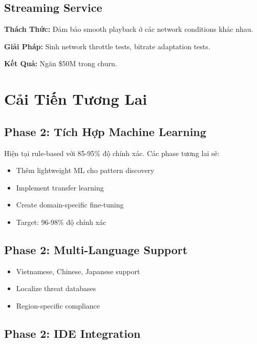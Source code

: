 \documentclass[12pt,oneside]{report}
\begin{document}
\section{Streaming Service}

\textbf{Thách Thức:} Đảm bảo smooth playback ở các network conditions khác nhau.

\textbf{Giải Pháp:} Sinh network throttle tests, bitrate adaptation tests.

\textbf{Kết Quả:} Ngăn \$50M trong churn.


\chapter{Cải Tiến Tương Lai}

\section{Phase 2: Tích Hợp Machine Learning}

Hiện tại rule-based với 85-95\% độ chính xác. Các phase tương lai sẽ:

\begin{itemize}
    \item Thêm lightweight ML cho pattern discovery
    \item Implement transfer learning
    \item Create domain-specific fine-tuning
    \item Target: 96-98\% độ chính xác
\end{itemize}

\section{Phase 2: Multi-Language Support}

\begin{itemize}
    \item Vietnamese, Chinese, Japanese support
    \item Localize threat databases
    \item Region-specific compliance
\end{itemize}

\section{Phase 2: IDE Integration}
\end{document}
